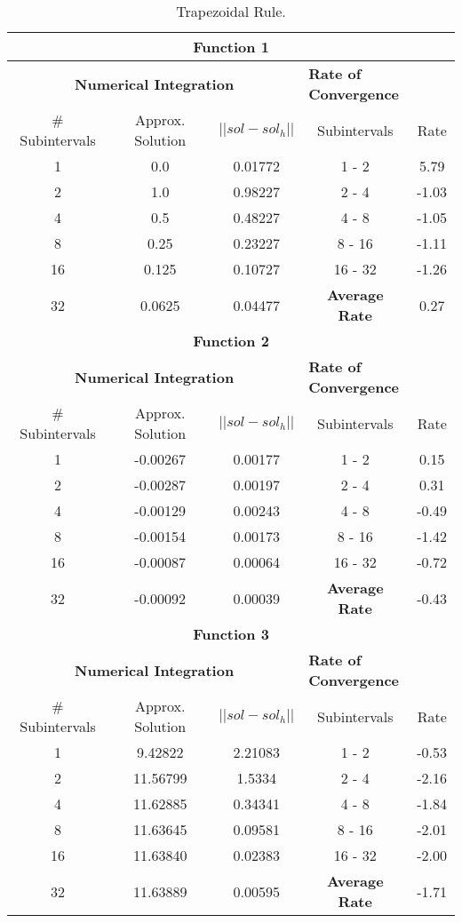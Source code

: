 \begin{table}[H]
    \centering
    \caption{Trapezoidal Rule.}
    \begin{tabular}{ccccc}
    \hline
    \multicolumn{5}{c}{\textbf{Function 1}} \\
    \hline
    \multicolumn{3}{c}{\textbf{Numerical Integration}} & \multicolumn{2}{l}{\textbf{Rate of Convergence}} \\\hline
    \# Subintervals & Approx. Solution & $|| sol - sol_h ||$ & Subintervals & Rate \\\hline
    1 & 0.0 & 0.01772 & 1 - 2 & 5.79 \\
    2 & 1.0 & 0.98227 & 2 - 4 & -1.03 \\
    4 & 0.5 & 0.48227 & 4 - 8 & -1.05 \\
    8 & 0.25 & 0.23227 & 8 - 16 & -1.11 \\
    16 & 0.125 & 0.10727 & 16 - 32 & -1.26 \\
    32 & 0.0625 & 0.04477 & \textbf{Average Rate} & 0.27\\ \hline
    \multicolumn{5}{c}{\textbf{Function 2}} \\
    \hline
    \multicolumn{3}{c}{\textbf{Numerical Integration}} & \multicolumn{2}{l}{\textbf{Rate of Convergence}} \\\hline
    \# Subintervals & Approx. Solution & $|| sol - sol_h ||$ & Subintervals & Rate \\\hline
    1 & -0.00267 & 0.00177 & 1 - 2 & 0.15 \\
    2 & -0.00287 & 0.00197 & 2 - 4 & 0.31 \\
    4 & -0.00129 & 0.00243 & 4 - 8 & -0.49 \\
    8 & -0.00154 & 0.00173 & 8 - 16 & -1.42 \\
    16 & -0.00087 & 0.00064 & 16 - 32 & -0.72 \\
    32 & -0.00092 & 0.00039 & \textbf{Average Rate} & -0.43\\ \hline
    \multicolumn{5}{c}{\textbf{Function 3}} \\
    \hline
    \multicolumn{3}{c}{\textbf{Numerical Integration}} & \multicolumn{2}{l}{\textbf{Rate of Convergence}} \\\hline
    \# Subintervals & Approx. Solution & $|| sol - sol_h ||$ & Subintervals & Rate \\\hline
    1 & 9.42822 & 2.21083 & 1 - 2 & -0.53 \\
    2 & 11.56799 & 1.5334 & 2 - 4 &  -2.16\\
    4 & 11.62885 & 0.34341 & 4 - 8 &  -1.84\\
    8 & 11.63645 & 0.09581 & 8 - 16 &  -2.01\\
    16 & 11.63840 & 0.02383 & 16 - 32 &  -2.00\\
    32 & 11.63889 & 0.00595 & \textbf{Average Rate} & -1.71\\ \hline
\end{tabular}
\end{table}

